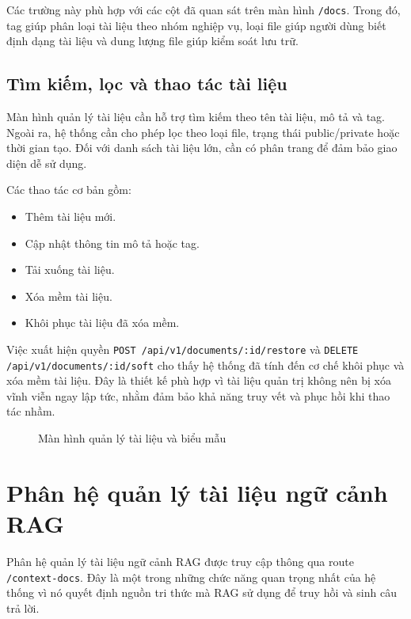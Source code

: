 \documentclass[12pt,a4paper]{report}
\begin{document}
Các trường này phù hợp với các cột đã quan sát trên màn hình \texttt{/docs}. Trong đó, tag giúp phân loại tài liệu theo nhóm nghiệp vụ, loại file giúp người dùng biết định dạng tài liệu và dung lượng file giúp kiểm soát lưu trữ.

\subsection{Tìm kiếm, lọc và thao tác tài liệu}

Màn hình quản lý tài liệu cần hỗ trợ tìm kiếm theo tên tài liệu, mô tả và tag. Ngoài ra, hệ thống cần cho phép lọc theo loại file, trạng thái public/private hoặc thời gian tạo. Đối với danh sách tài liệu lớn, cần có phân trang để đảm bảo giao diện dễ sử dụng.

Các thao tác cơ bản gồm:

\begin{itemize}
    \item Thêm tài liệu mới.
    \item Cập nhật thông tin mô tả hoặc tag.
    \item Tải xuống tài liệu.
    \item Xóa mềm tài liệu.
    \item Khôi phục tài liệu đã xóa mềm.
\end{itemize}

Việc xuất hiện quyền \texttt{POST /api/v1/documents/:id/restore} và \texttt{DELETE /api/v1/documents/:id/soft} cho thấy hệ thống đã tính đến cơ chế khôi phục và xóa mềm tài liệu. Đây là thiết kế phù hợp vì tài liệu quản trị không nên bị xóa vĩnh viễn ngay lập tức, nhằm đảm bảo khả năng truy vết và phục hồi khi thao tác nhầm.

\begin{figure}[H]
    \centering
    \caption{Màn hình quản lý tài liệu và biểu mẫu}
    \label{fig:docs-management}
\end{figure}

\section{Phân hệ quản lý tài liệu ngữ cảnh RAG}

Phân hệ quản lý tài liệu ngữ cảnh RAG được truy cập thông qua route \texttt{/context-docs}. Đây là một trong những chức năng quan trọng nhất của hệ thống vì nó quyết định nguồn tri thức mà RAG sử dụng để truy hồi và sinh câu trả lời.
\end{document}
